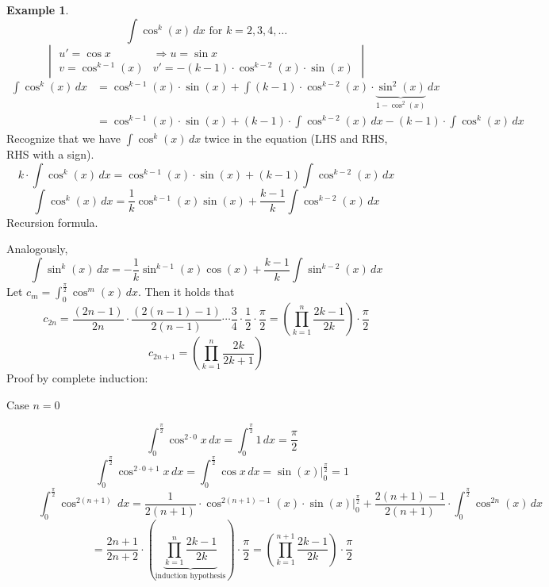 \documentclass[a4paper,landscape,twocolumn]{article}
\theoremstyle{definition}
\newtheorem{ex}{Example}
\begin{document}
\begin{ex}
  \[ \int \cos^k(x) \, dx \text{ for } k = 2,3,4,\ldots \]
  \[
    \begin{vmatrix}
      u' = \cos{x} & \Rightarrow u = \sin{x} \\
      v = \cos^{k-1}(x) & v' = - (k-1) \cdot \cos^{k-2}(x) \cdot \sin(x)
    \end{vmatrix}
  \] \begin{align*}
    \int \cos^k(x) \, dx
      &= \cos^{k-1}(x) \cdot \sin(x) + \int (k-1) \cdot \cos^{k-2}(x) \cdot \underbrace{\sin^2(x)}_{1 - \cos^2(x)} \, dx \\
      &= \cos^{k-1}(x) \cdot \sin(x) + (k-1) \cdot \int \cos^{k-2}(x) \, dx - (k-1) \cdot \int \cos^k(x) \, dx
  \end{align*}
  Recognize that we have $\int \cos^k(x) \, dx$ twice in the equation (LHS and RHS, RHS with a sign).
  \[
    k \cdot \int \cos^k(x) \, dx
      = \cos^{k-1}(x) \cdot \sin(x) + (k-1) \int \cos^{k-2}(x) \, dx
  \] \[
    \int \cos^k(x) \, dx = \frac1k \cos^{k-1}(x) \sin(x) + \frac{k-1}{k} \int \cos^{k-2}(x) \, dx
  \]
  Recursion formula.

  Analogously,
  \[ \int \sin^k(x) \, dx = -\frac1k \sin^{k-1}(x) \cos(x) + \frac{k-1}{k} \int \sin^{k-2}(x) \, dx \]
  Let $c_m = \int_0^{\frac\pi2} \cos^m(x) \, dx$. Then it holds that
  \[
    c_{2n} = \frac{(2n - 1)}{2n} \cdot \frac{(2(n-1) - 1)}{2(n-1)} \cdots \frac34 \cdot \frac12 \cdot \frac\pi2
      = \left(\prod_{k=1}^n \frac{2k - 1}{2k}\right) \cdot \frac\pi2
  \] \[
    c_{2n + 1} = \left(
      \prod_{k=1}^n \frac{2k}{2k+1}
    \right)
  \]
  Proof by complete induction:
  \begin{description}
    \item[Case $n=0$]
      \[ \int_0^{\frac\pi2} \cos^{2\cdot 0} x \, dx = \int_0^{\frac\pi2} 1 \, dx = \frac\pi2 \]
      \[ \int_0^{\frac\pi2} \cos^{2\cdot 0 + 1} x \, dx = \int_0^{\frac\pi2} \cos{x} \, dx = \sin(x)|_0^{\frac\pi2} = 1 \]
      \[
        \int_0^{\frac\pi2} \cos^{2(n+1)} \, dx
          = \frac{1}{2(n+1)} \cdot \cos^{2(n+1)-1}(x) \cdot \sin(x) |_0^{\frac\pi2}
          + \frac{2(n+1) - 1}{2(n+1)} \cdot \int_0^{\frac\pi2} \cos^{2n}(x) \, dx
      \] \[
        = \frac{2n+1}{2n+2} \cdot \left(\underbrace{\prod_{k=1}^n \frac{2k-1}{2k}}_{\text{induction hypothesis}}\right) \cdot \frac\pi2
        = \left(\prod_{k=1}^{n+1} \frac{2k-1}{2k}\right) \cdot \frac\pi2
      \]
  \end{description}
\end{ex}
\end{document}
